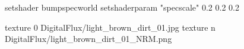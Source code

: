 setshader bumpspecworld
setshaderparam "specscale" 0.2 0.2 0.2

texture 0 DigitalFlux/light_brown_dirt_01.jpg
texture n DigitalFlux/light_brown_dirt_01_NRM.png
